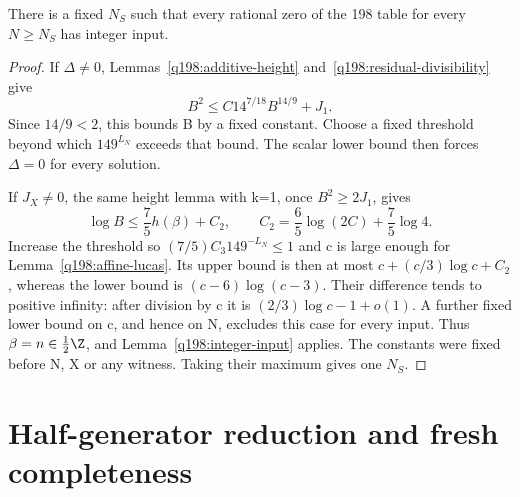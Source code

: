 \begin{proposition}\label{q198:soundness}
There is a fixed $N_S$ such that every rational zero of the 198
table for every $N\ge N_S$ has integer input.
\end{proposition}
\begin{proof}
If $\Delta\ne0$, Lemmas~\ref{q198:additive-height}
and~\ref{q198:residual-divisibility} give
\[
 B^2\le C14^{7/18}B^{14/9}+J_1.
\]
Since $14/9<2$, this bounds B by a fixed constant. Choose a fixed
threshold beyond which $149^{L_N}$ exceeds that bound. The scalar
lower bound then forces $\Delta=0$ for every solution.

If $J_X\ne0$, the same height lemma with k=1, once $B^2\ge2J_1$,
gives
\[
 \log B\le\frac75h(\beta)+C_2,\qquad
 C_2=\frac65\log(2C)+\frac75\log4.
\]
Increase the threshold so $(7/5)C_3 149^{-L_N}\le1$ and c is
large enough for Lemma~\ref{q198:affine-lucas}. Its upper bound is
then at most $c+(c/3)\log c+C_2$, whereas the lower bound is
$(c-6)\log(c-3)$. Their difference tends to positive infinity:
after division by c it is $(2/3)\log c-1+o(1)$.
A further fixed lower bound on c, and hence on N, excludes this
case for every input. Thus $\beta=n\in\tfrac12\Z$, and
Lemma~\ref{q198:integer-input} applies. The constants were fixed
before N, X or any witness. Taking their maximum gives one $N_S$.
\end{proof}

\section{Half-generator reduction and fresh completeness}
\label{q198:completeness-section}

